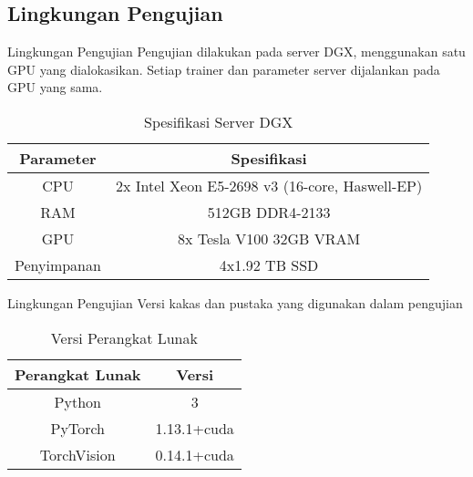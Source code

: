 \subsection{Lingkungan Pengujian}
\begin{frame}{Lingkungan Pengujian}
  Pengujian dilakukan pada server DGX, menggunakan satu GPU yang dialokasikan. Setiap trainer dan parameter server dijalankan pada GPU yang sama.

  \begin{table}
    \caption{Spesifikasi Server DGX}
    \centering
    \begin{tabular}[ht]{ | c | c | }
      \hline
      \textbf{Parameter} & \textbf{Spesifikasi}                           \\
      \hline
      CPU                & 2x Intel Xeon E5-2698 v3 (16-core, Haswell-EP) \\
      \hline
      RAM                & 512GB DDR4-2133                                \\
      \hline
      GPU                & 8x Tesla V100 32GB VRAM                        \\
      \hline
      Penyimpanan        & 4x1.92 TB SSD                                  \\
      \hline
    \end{tabular}
  \end{table}
\end{frame}

\begin{frame}{Lingkungan Pengujian}
  Versi kakas dan pustaka yang digunakan dalam pengujian
  \begin{table}
    \caption{Versi Perangkat Lunak}\label{softwares}
    \centering
    \begin{tabular}{ | c | c | }
      \hline
      \textbf{Perangkat Lunak} & \textbf{Versi} \\
      \hline
      Python                   & 3              \\
      \hline
      PyTorch                  & 1.13.1+cuda    \\
      \hline
      TorchVision              & 0.14.1+cuda    \\
      \hline
    \end{tabular}
  \end{table}
\end{frame}

